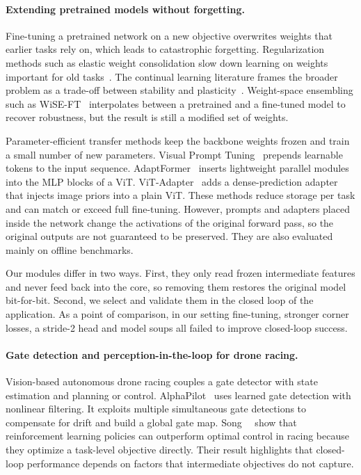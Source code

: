 \documentclass[10pt,twocolumn,letterpaper]{article}
\begin{document}
\paragraph{Extending pretrained models without forgetting.}
Fine-tuning a pretrained network on a new objective overwrites weights that earlier tasks rely on, which leads to catastrophic forgetting. Regularization methods such as elastic weight consolidation slow down learning on weights important for old tasks~\cite{Kirkpatrick2016OvercomingCatastrophic}. The continual learning literature frames the broader problem as a trade-off between stability and plasticity~\cite{Wang2023ComprehensiveSurvey}. Weight-space ensembling such as WiSE-FT~\cite{Wortsman2021RobustFinetuning} interpolates between a pretrained and a fine-tuned model to recover robustness, but the result is still a modified set of weights.

Parameter-efficient transfer methods keep the backbone weights frozen and train a small number of new parameters. Visual Prompt Tuning~\cite{Jia2022VisualPrompt} prepends learnable tokens to the input sequence. AdaptFormer~\cite{Chen2022AdaptformerAdapting} inserts lightweight parallel modules into the MLP blocks of a ViT. ViT-Adapter~\cite{Chen2022VisionTransformer} adds a dense-prediction adapter that injects image priors into a plain ViT. These methods reduce storage per task and can match or exceed full fine-tuning. However, prompts and adapters placed inside the network change the activations of the original forward pass, so the original outputs are not guaranteed to be preserved. They are also evaluated mainly on offline benchmarks.

Our modules differ in two ways. First, they only read frozen intermediate features and never feed back into the core, so removing them restores the original model bit-for-bit. Second, we select and validate them in the closed loop of the application. As a point of comparison, in our setting fine-tuning, stronger corner losses, a stride-2 head and model soups all failed to improve closed-loop success.

\paragraph{Gate detection and perception-in-the-loop for drone racing.}
Vision-based autonomous drone racing couples a gate detector with state estimation and planning or control. AlphaPilot~\cite{Foehn2020AlphapilotAutonomous} uses learned gate detection with nonlinear filtering. It exploits multiple simultaneous gate detections to compensate for drift and build a global gate map. Song~\etal~\cite{Song2023ReachingLimit} show that reinforcement learning policies can outperform optimal control in racing because they optimize a task-level objective directly. Their result highlights that closed-loop performance depends on factors that intermediate objectives do not capture.
\end{document}

